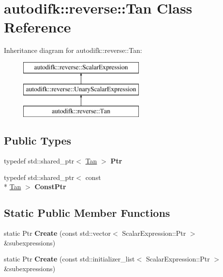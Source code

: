 \hypertarget{classautodifk_1_1reverse_1_1_tan}{\section{autodifk\-:\-:reverse\-:\-:Tan Class Reference}
\label{classautodifk_1_1reverse_1_1_tan}
}
Inheritance diagram for autodifk\-:\-:reverse\-:\-:Tan\-:\begin{figure}[H]
\begin{center}
\leavevmode
\includegraphics[height=3.000000cm]{classautodifk_1_1reverse_1_1_tan}
\end{center}
\end{figure}
\subsection*{Public Types}
\begin{DoxyCompactItemize}
\item 
\hypertarget{classautodifk_1_1reverse_1_1_tan_aa951354e1c9f764b5e20d3126e174319}{typedef std\-::shared\-\_\-ptr$<$ \hyperlink{classautodifk_1_1reverse_1_1_tan}{Tan} $>$ {\bfseries Ptr}}\label{classautodifk_1_1reverse_1_1_tan_aa951354e1c9f764b5e20d3126e174319}

\item 
\hypertarget{classautodifk_1_1reverse_1_1_tan_aea6f6ac03be50419240104dc4862dc93}{typedef std\-::shared\-\_\-ptr$<$ const \\*
\hyperlink{classautodifk_1_1reverse_1_1_tan}{Tan} $>$ {\bfseries Const\-Ptr}}\label{classautodifk_1_1reverse_1_1_tan_aea6f6ac03be50419240104dc4862dc93}

\end{DoxyCompactItemize}
\subsection*{Static Public Member Functions}
\begin{DoxyCompactItemize}
\item 
\hypertarget{classautodifk_1_1reverse_1_1_tan_a7350ee3a1c6a8990ca3226e7f6404886}{static Ptr {\bfseries Create} (const std\-::vector$<$ Scalar\-Expression\-::\-Ptr $>$ \&subexpressions)}\label{classautodifk_1_1reverse_1_1_tan_a7350ee3a1c6a8990ca3226e7f6404886}

\item 
\hypertarget{classautodifk_1_1reverse_1_1_tan_a602e6795dc44d5b89712b5921acaf618}{static Ptr {\bfseries Create} (const std\-::initializer\-\_\-list$<$ Scalar\-Expression\-::\-Ptr $>$ \&subexpressions)}\label{classautodifk_1_1reverse_1_1_tan_a602e6795dc44d5b89712b5921acaf618}

\end{DoxyCompactItemize}
